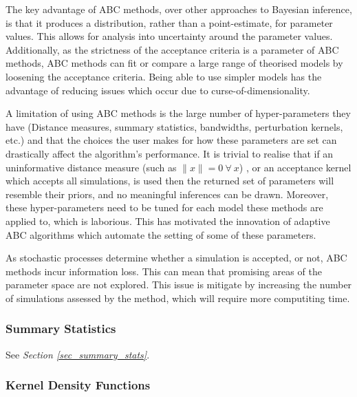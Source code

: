 \documentclass[11pt,a4paper]{article}
\theoremstyle{break}
\begin{document}
  \par The key advantage of ABC methods, over other approaches to Bayesian inference, is that it produces a distribution, rather than a point-estimate, for parameter values. This allows for analysis into uncertainty around the parameter values. Additionally, as the strictness of the acceptance criteria is a parameter of ABC methods, ABC methods can fit or compare a large range of theorised models by loosening the acceptance criteria. Being able to use simpler models has the advantage of reducing issues which occur due to curse-of-dimensionality.

  \par A limitation of using ABC methods is the large number of hyper-parameters they have (Distance measures, summary statistics, bandwidths, perturbation kernels, etc.) and that the choices the user makes for how these parameters are set can drastically affect the algorithm's performance. It is trivial to realise that if an uninformative distance measure (such as $\|x\|=0\ \forall\ x$) , or an acceptance kernel which accepts all simulations, is used then the returned set of parameters will resemble their priors, and no meaningful inferences can be drawn. Moreover, these hyper-parameters need to be tuned for each model these methods are applied to, which is laborious. This has motivated the innovation of adaptive ABC algorithms which automate the setting of some of these parameters.

  \par As stochastic processes determine whether a simulation is accepted, or not, ABC methods incur information loss. This can mean that promising areas of the parameter space are not explored. This issue is mitigate by increasing the number of simulations assessed by the method, which will require more computiting time.

\subsubsection*{Summary Statistics}

  \par See \textit{Section \ref{sec_summary_stats}}.

\subsubsection*{Kernel Density Functions}
\end{document}
